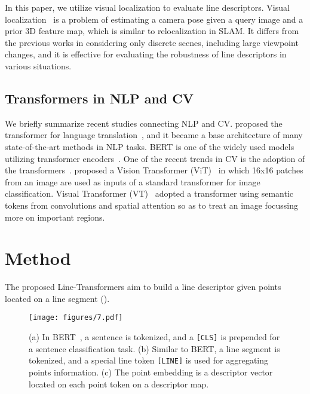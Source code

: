 \documentclass[letterpaper, 10 pt, journal, twoside]{ieeetran}
\begin{document}
In this paper, we utilize visual localization to evaluate line descriptors. Visual localization~\cite{Toft2020, Paul2019} is a problem of estimating a camera pose given a query image and a prior 3D feature map, which is similar to relocalization in \ac{SLAM}. It differs from the previous works in considering only discrete scenes, including large viewpoint changes, and it is effective for evaluating the robustness of line descriptors in various situations.


\subsection{Transformers in \ac{NLP} and \ac{CV}}

We briefly summarize recent studies connecting NLP and CV. \citeauthor{Vaswani2017} proposed the transformer for language translation~\cite{Vaswani2017}, and it became a base architecture of many state-of-the-art methods in \ac{NLP} tasks. \ac{BERT} is one of the widely used models utilizing transformer encoders~\cite{Devlin2018}. One of the recent trends in \ac{CV} is the adoption of the transformers~\cite{Dosovitskiy2020, Wu2020}. \citeauthor{Dosovitskiy2020} proposed a Vision Transformer (ViT)~\cite{Dosovitskiy2020} in which 16x16 patches from an image are used as inputs of a standard transformer for image classification. Visual Transformer (VT)~\cite{Wu2020} adopted a transformer using semantic tokens from convolutions and spatial attention so as to treat an image focussing more on important regions.


\section{Method}
\label{sec:method}

The proposed Line-Transformers aim to build a line descriptor given points located on a line segment ().



\begin{figure}[!b]
	\centering
	\texttt{[image: figures/7.pdf]}
	\caption{(a) In BERT~\cite{Devlin2018}, a sentence is tokenized, and a \texttt{[CLS]} is prepended for a sentence classification task. (b) Similar to BERT, a line segment is tokenized, and a special line token \texttt{[LINE]} is used for aggregating points information. (c) The point embedding is a descriptor vector located on each point token on a descriptor map.}
	\label{fig:sentence}
	\vspace{-5mm}
\end{figure}
\end{document}
